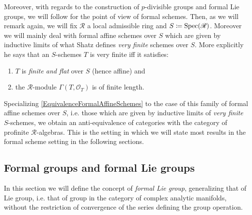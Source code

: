 \begin{rem}[]\label{rem:VeryFiniteSchemes}
	Moreover, with regards to the construction of $p$-divisible groups
	and formal Lie groups, we will follow \cite[\S5]{Shatz} for the point
	of view of formal schemes.
	Then, as we will remark again, we will fix $\mathscr{R}$ a 
	local admissible ring and $S \coloneqq \operatorname{Spec}(\mathscr{R})$.
	Moreover we will mainly deal with formal affine schemes over $S$ which
	are given by inductive limits of what Shatz defines \emph{very finite} schemes over $S$.
	More explicitly he says that an $S$-schemes $T$ is very finite iff it satisfies:
	\begin{enumerate}
		\item $T$ is \emph{finite and flat} over $S$ (hence affine) and
		\item the $\mathscr{R}$-module $\Gamma \left( T , \mathcal{O}_{ T } \right)$
			is of finite length.
	\end{enumerate}
	Specializing \cref{EquivalenceFormalAffineSchemes} to the case of
	this family of formal affine schemes over $S$, i.e. those
	which are given by inductive limits of \emph{very finite} $S$-schemes,
	we obtain an anti-equivalence of categories with the category of
	profinite $\mathscr{R}$-algebras.
	This is the setting in which we will state most results in the 
	formal scheme setting in the following sections.
\end{rem}





\subsection{Formal groups and formal Lie groups}
In this section we will define the concept of \emph{formal Lie group},
generalizing that of Lie group, i.e. that of group in the category of
complex analytic manifolds, without the restriction of convergence
of the series defining the group operation.

